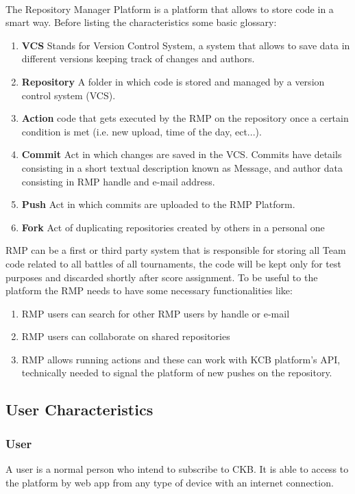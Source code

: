 \paragraph{}
The Repository Manager Platform is a platform that allows to store code in a smart way. Before listing the characteristics some basic glossary:
\begin{enumerate}
    \item \textbf{VCS} Stands for Version Control System, a system that allows to save data in different versions keeping track of changes and authors.
    \item \textbf{Repository} A folder in which code is stored and managed by a version control system (VCS).
    \item \textbf{Action} code that gets executed by the RMP on the repository once a certain condition is met (i.e. new upload, time of the day, ect...).
    \item \textbf{Commit} Act in which changes are saved in the VCS. Commits have details consisting in a short textual description known as Message, and author data consisting in RMP handle and e-mail address.
    \item \textbf{Push} Act in which commits are uploaded to the RMP Platform.
    \item \textbf{Fork} Act of duplicating repositories created by others in a personal one
\end{enumerate}
RMP can be a first or third party system that is responsible for storing all Team code related to all battles of all tournaments, the code will be kept only for test purposes and discarded shortly after score assignment. 
To be useful to the platform the RMP needs to have some necessary functionalities like:
\begin{enumerate}
    \item RMP users can search for other RMP users by handle or e-mail
    \item RMP users can collaborate on shared repositories
    \item RMP allows running actions and these can work with KCB platform's API, technically needed to signal the platform of new pushes on the repository.
\end{enumerate}

\subsection{User Characteristics}

\subsubsection{User}
A user is a normal person who intend to subscribe to CKB. It is able to access to the platform by web app from any type of device with an internet connection.

